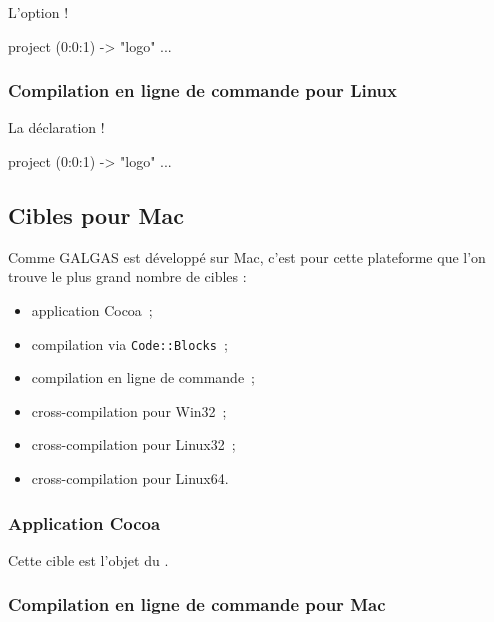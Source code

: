 L'option \ggs!%
\begin{galgas}
project (0:0:1) -> "logo" {
  ...
}
\end{galgas}

\subsubsection{Compilation en ligne de commande pour Linux}

La déclaration \ggs!%
\begin{galgas}
project (0:0:1) -> "logo" {
  ...
}
\end{galgas}



\subsection{Cibles pour Mac}

Comme GALGAS est développé sur Mac, c'est pour cette plateforme que l'on trouve le plus grand nombre de cibles :
\begin{itemize}
  \item application Cocoa~;
  \item compilation via \texttt{Code{}::Blocks}~;
  \item compilation en ligne de commande~;
  \item cross-compilation pour Win32~;
  \item cross-compilation pour Linux32~;
  \item cross-compilation pour Linux64.
\end{itemize}

\subsubsection{Application Cocoa}

Cette cible est l'objet du .

\subsubsection{Compilation en ligne de commande pour Mac}

